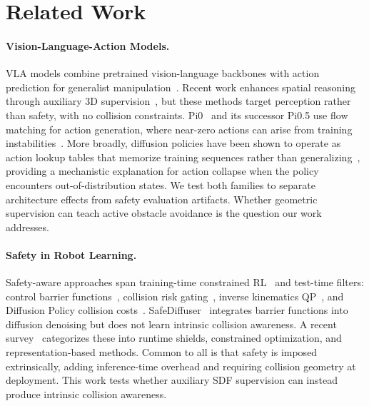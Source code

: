 \section{Related Work}\label{sec:related}

\paragraph{Vision-Language-Action Models.}
VLA models combine pretrained vision-language backbones with action prediction for generalist manipulation~\cite{brohan2023rt2,black2024pi0,kim2024openvla}. Recent work enhances spatial reasoning through auxiliary 3D supervision~\cite{li2025spatialforcing,li2025qdepth,depthvla2025}, but these methods target perception rather than safety, with no collision constraints. Pi0~\cite{black2024pi0} and its successor Pi0.5 use flow matching for action generation, where near-zero actions can arise from training instabilities~\cite{dong2025conditioning}. More broadly, diffusion policies have been shown to operate as action lookup tables that memorize training sequences rather than generalizing~\cite{he2025demystifying}, providing a mechanistic explanation for action collapse when the policy encounters out-of-distribution states. We test both families to separate architecture effects from safety evaluation artifacts. Whether geometric supervision can teach active obstacle avoidance is the question our work addresses.

\paragraph{Safety in Robot Learning.}
Safety-aware approaches span training-time constrained RL~\cite{zhang2025safevla} and test-time filters: control barrier functions~\cite{hu2025vlsa,singletary2022safecritical}, collision risk gating~\cite{cofreeevla2026}, inverse kinematics QP~\cite{spalter2024ikinqp}, and Diffusion Policy collision costs~\cite{li2024langguided,yang2025cape}. SafeDiffuser~\cite{xiao2025safediffuser} integrates barrier functions into diffusion denoising but does not learn intrinsic collision awareness. A recent survey~\cite{li2026vlasafety} categorizes these into runtime shields, constrained optimization, and representation-based methods. Common to all is that safety is imposed extrinsically, adding inference-time overhead and requiring collision geometry at deployment. This work tests whether auxiliary SDF supervision can instead produce intrinsic collision awareness.

